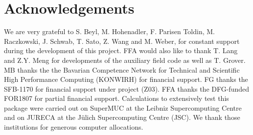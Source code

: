 \documentclass[10pt,Arial]{scrartcl}
\begin{document}
\section*{Acknowledgements} 
We are very grateful to  S. Beyl, M. Hohenadler,  F. Parisen Toldin,  M. Raczkowski,  J. Schwab, T. Sato, Z. Wang and M. Weber,  for constant support during the development of this project.  FFA would also like to thank T. Lang   and Z.Y. Meng for  developments of the auxiliary field code as well as T. Grover. 
 MB thanks the the Bavarian Competence Network for Technical and Scientific High Performance Computing (KONWIRH) for financial support. FG thanks the SFB-1170 for  financial support under project (Z03).  FFA thanks the DFG-funded FOR1807 for partial financial support.
Calculations  to extensively test this package were carried out on SuperMUC at the  Leibniz Supercomputing Centre and on  JURECA \cite{Jureca16} at the J\"ulich Supercomputing Centre (JSC). We thank those institutions for generous computer allocations.  


 



\end{document}
